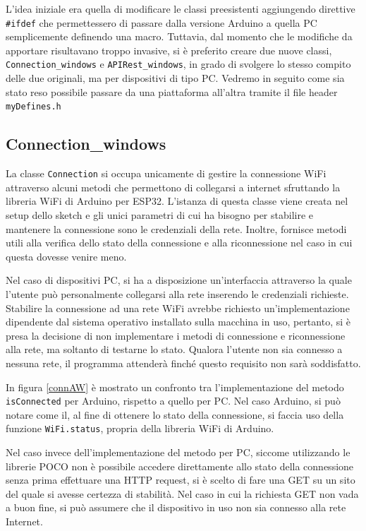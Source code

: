 L’idea iniziale era quella di modificare le classi preesistenti aggiungendo direttive \texttt{\#ifdef} che permettessero di passare dalla versione Arduino a quella PC semplicemente definendo una macro. Tuttavia, dal momento che le modifiche da apportare risultavano troppo invasive, si è preferito creare due nuove classi, \texttt{Connection\_windows} e \texttt{APIRest\_windows}, in grado di svolgere lo stesso compito delle due originali, ma per dispositivi di tipo PC. Vedremo in seguito come sia stato reso possibile passare da una piattaforma all'altra tramite il file header \texttt{myDefines.h} 
\subsection{Connection\_windows}
La classe \texttt{Connection} si occupa unicamente di gestire la connessione WiFi attraverso alcuni metodi che permettono di collegarsi a internet sfruttando la libreria WiFi di Arduino per ESP32. L'istanza di questa classe viene creata nel setup dello sketch e gli unici parametri di cui ha bisogno per stabilire e mantenere la connessione sono le credenziali della rete. Inoltre, fornisce metodi utili alla verifica dello stato della connessione e alla riconnessione nel caso in cui questa dovesse venire meno.

Nel caso di dispositivi PC, si ha a disposizione un’interfaccia attraverso la quale l’utente può personalmente collegarsi alla rete inserendo le credenziali richieste. Stabilire la connessione ad una rete WiFi avrebbe richiesto un’implementazione dipendente dal sistema operativo installato sulla macchina in uso, pertanto, si è presa la decisione di non implementare i metodi di connessione e riconnessione alla rete, ma soltanto di testarne lo stato. Qualora l’utente non sia connesso a nessuna rete, il programma attenderà finché questo requisito non sarà soddisfatto.

In figura \ref{connAW} è mostrato un confronto tra l’implementazione del metodo \texttt{isConnected} per Arduino, rispetto a quello per PC. Nel caso Arduino, si può notare come il, al fine di ottenere lo stato della connessione, si faccia uso della funzione \texttt{WiFi.status}, propria della libreria WiFi di Arduino.

Nel caso invece dell'implementazione del metodo per PC, siccome utilizzando le librerie POCO non è possibile accedere direttamente allo stato della connessione senza prima effettuare una HTTP request, si è scelto di fare una GET su un sito del quale si avesse certezza di stabilità. Nel caso in cui la richiesta GET non vada a buon fine, si può assumere che il dispositivo in uso non sia connesso alla rete Internet.

